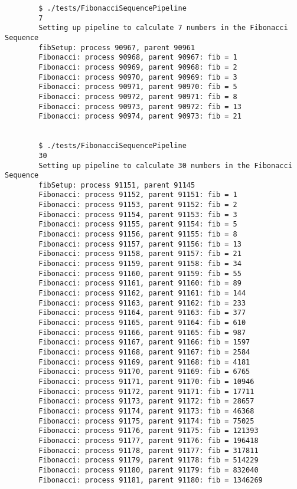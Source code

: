 \documentclass{article}
\begin{document}
        \begin{verbatim}
        $ ./tests/FibonacciSequencePipeline
        7
        Setting up pipeline to calculate 7 numbers in the Fibonacci Sequence
        fibSetup: process 90967, parent 90961
        Fibonacci: process 90968, parent 90967: fib = 1
        Fibonacci: process 90969, parent 90968: fib = 2
        Fibonacci: process 90970, parent 90969: fib = 3
        Fibonacci: process 90971, parent 90970: fib = 5
        Fibonacci: process 90972, parent 90971: fib = 8
        Fibonacci: process 90973, parent 90972: fib = 13
        Fibonacci: process 90974, parent 90973: fib = 21


        $ ./tests/FibonacciSequencePipeline
        30
        Setting up pipeline to calculate 30 numbers in the Fibonacci Sequence
        fibSetup: process 91151, parent 91145
        Fibonacci: process 91152, parent 91151: fib = 1
        Fibonacci: process 91153, parent 91152: fib = 2
        Fibonacci: process 91154, parent 91153: fib = 3
        Fibonacci: process 91155, parent 91154: fib = 5
        Fibonacci: process 91156, parent 91155: fib = 8
        Fibonacci: process 91157, parent 91156: fib = 13
        Fibonacci: process 91158, parent 91157: fib = 21
        Fibonacci: process 91159, parent 91158: fib = 34
        Fibonacci: process 91160, parent 91159: fib = 55
        Fibonacci: process 91161, parent 91160: fib = 89
        Fibonacci: process 91162, parent 91161: fib = 144
        Fibonacci: process 91163, parent 91162: fib = 233
        Fibonacci: process 91164, parent 91163: fib = 377
        Fibonacci: process 91165, parent 91164: fib = 610
        Fibonacci: process 91166, parent 91165: fib = 987
        Fibonacci: process 91167, parent 91166: fib = 1597
        Fibonacci: process 91168, parent 91167: fib = 2584
        Fibonacci: process 91169, parent 91168: fib = 4181
        Fibonacci: process 91170, parent 91169: fib = 6765
        Fibonacci: process 91171, parent 91170: fib = 10946
        Fibonacci: process 91172, parent 91171: fib = 17711
        Fibonacci: process 91173, parent 91172: fib = 28657
        Fibonacci: process 91174, parent 91173: fib = 46368
        Fibonacci: process 91175, parent 91174: fib = 75025
        Fibonacci: process 91176, parent 91175: fib = 121393
        Fibonacci: process 91177, parent 91176: fib = 196418
        Fibonacci: process 91178, parent 91177: fib = 317811
        Fibonacci: process 91179, parent 91178: fib = 514229
        Fibonacci: process 91180, parent 91179: fib = 832040
        Fibonacci: process 91181, parent 91180: fib = 1346269
        \end{verbatim}
\end{document}

